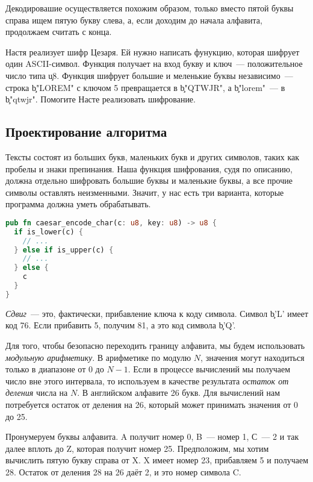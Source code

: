 Декодировашие осуществляется похожим образом, только вместо пятой буквы справа ищем пятую букву слева, а, если доходим до начала алфавита, продолжаем считать с конца.

\begin{Exercise}
  \Question
  Настя реализует шифр Цезаря. Ей нужно написать фунукцию, которая шифрует один ASCII-символ.
  Функция получает на вход букву и ключ~--- положительное число типа \c{u8}.
  Функция шифрует большие и меленькие буквы независимо~--- строка \c{b"LOREM"} с ключом 5 превращается в \c{b"QTWJR"}, а \c{b"lorem"}~--- в \c{b"qtwjr"}.
  Помогите Насте реализовать шифрование.
\end{Exercise}

\subsection{Проектирование алгоритма}

Тексты состоят из больших букв, маленьких букв и других символов, таких как пробелы и знаки препинания.
Наша функция шифрования, судя по описанию, должна отдельно шифровать большие буквы и маленькие буквы, а все прочие символы оставлять неизменными.
Значит, у нас есть три варианта, которые программа должна уметь обрабатывать.

\begin{lstlisting}[language=Rust]
pub fn caesar_encode_char(c: u8, key: u8) -> u8 {
  if is_lower(c) {
    // ...
  } else if is_upper(c) {
    // ...
  } else {
    c
  }
}
\end{lstlisting}

{\em Сдвиг}~--- это, фактически, прибавление ключа к коду символа. Символ \c{b'L'} имеет код 76.
Если прибавить 5, получим 81, а это код символа \c{b'Q'}.

Для того, чтобы безопасно переходить границу алфавита, мы будем использовать {\em модульную арифметику}.
В арифметике по модулю $N$, значения могут находиться только в диапазоне от $0$ до $N - 1$.
Если в процессе вычислений мы получаем число вне этого интервала, то используем в качестве результата {\em остаток от деления} числа на $N$.
В английском алфавите 26 букв. Для вычислений нам потребуется остаток от деления на 26, который может принимать значения от 0 до 25.

Пронумеруем буквы алфавита. A получит номер 0, B~--- номер 1, С~--- 2 и так далее вплоть до Z, которая получит номер 25.
Предположим, мы хотим вычислить пятую букву справа от X. X имеет номер 23, прибавляем 5 и получаем 28.
Остаток от деления 28 на 26 даёт 2, и это номер символа C.

